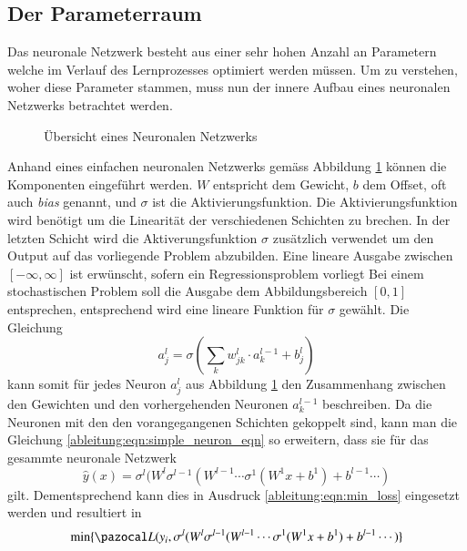 \subsection{Der Parameterraum}
Das neuronale Netzwerk besteht aus einer sehr hohen Anzahl an Parametern welche im Verlauf des Lernprozesses optimiert werden müssen. Um zu verstehen, woher diese Parameter stammen, muss nun der innere Aufbau eines neuronalen Netzwerks betrachtet werden.
\begin{figure}
	\begin{center}
		
		\caption{Übersicht eines Neuronalen Netzwerks}
		\label{ableitung:fig:neuronal_network}
	\end{center}
\end{figure} 
Anhand eines einfachen neuronalen Netzwerks gemäss Abbildung \ref{ableitung:fig:neuronal_network} können die Komponenten eingeführt werden. $W$ entspricht dem Gewicht, $b$ dem Offset, oft auch \textit{bias} genannt, und $\sigma$ ist die Aktivierungsfunktion. Die Aktivierungsfunktion wird benötigt um die Linearität der verschiedenen Schichten zu brechen. In der letzten Schicht wird die Aktiverungsfunktion $\sigma$ zusätzlich verwendet um den Output auf das vorliegende Problem abzubilden. Eine lineare Ausgabe zwischen $[-\infty, \infty]$ ist erwünscht, sofern ein Regressionsproblem vorliegt Bei einem stochastischen Problem soll die Ausgabe dem Abbildungsbereich $[0, 1]$ entsprechen, entsprechend wird eine lineare Funktion für $\sigma$ gewählt. Die Gleichung
\begin{equation}
a^{l}_{j} = \sigma \left( \sum\limits_{k}w^{l}_{jk} \cdot a^{l-1}_{k}+b^{l}_{j} \right)
\label{ableitung:eqn:simple_neuron_eqn}
\end{equation}
kann somit für jedes Neuron $a^{l}_{j}$ aus Abbildung \ref{ableitung:fig:neuronal_network} den Zusammenhang zwischen den Gewichten und den vorhergehenden Neuronen $a^{l-1}_{k}$ beschreiben.
Da die Neuronen mit den den vorangegangenen Schichten gekoppelt sind, kann man die Gleichung \eqref{ableitung:eqn:simple_neuron_eqn} so erweitern, dass sie für das gesammte neuronale Netzwerk
\begin{equation}
\hat{y}(x) = \sigma^{l}(W^{l}\sigma^{l-1}(W^{l-1}\cdots \sigma^{1}(W^{1}x+b^{1}) + b^{l-1} \cdots )
\label{ableitung:eqn:full_net}
\end{equation}
gilt. Dementsprechend kann dies in Ausdruck \eqref{ableitung:eqn:min_loss} eingesetzt werden und resultiert in
\begin{equation}
	\min \{ \Lb(y_{i}, \sigma^{l}(W^{l}\sigma^{l-1}(W^{l-1}\cdots \sigma^{1}(W^{1}x+b^{1}) + b^{l-1} \cdots ) \}
\end{equation}
